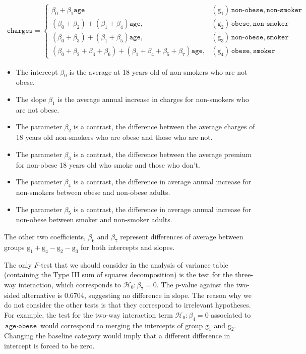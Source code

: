 \documentclass[
  11pt,
  letterpaper,
]{book}
\providecommand{\tightlist}{%
  \setlength{\itemsep}{0pt}\setlength{\parskip}{0pt}}
\theoremstyle{definition}
\theoremstyle{definition}
\theoremstyle{definition}
\theoremstyle{remark}
\begin{document}
\begin{align*}
\texttt{charges}  = 
\begin{cases}
\beta_{0} + \beta_{1}\texttt{age}  & (\mathrm{g}_1)\, \texttt{non-obese}, \texttt{non-smoker} \\
(\beta_{0} + \beta_{2}) + (\beta_{1} + \beta_{4})\texttt{age},  & (\mathrm{g}_2)\,  \texttt{obese}, \texttt{non-smoker} \\
(\beta_{0} + \beta_{3}) + (\beta_{1} + \beta_{5})\texttt{age},  & (\mathrm{g}_3)\,  \texttt{non-obese}, \texttt{smoker} \\
(\beta_{0} + \beta_{2} + \beta_{3}+ \beta_{6}) + (\beta_{1} + \beta_{4} +\beta_{5} + \beta_7)\texttt{age},  & (\mathrm{g}_4)\,  \texttt{obese}, \texttt{smoker}
\end{cases}
\end{align*}

\begin{itemize}
\tightlist
\item
  The intercept \(\beta_0\) is the average at 18 years old of non-smokers who are not obese.
\item
  The slope \(\beta_1\) is the average annual increase in charges for non-smokers who are not obese.
\item
  The parameter \(\beta_2\) is a contrast, the difference between the average charges of 18 years old non-smokers who are obese and those who are not.
\item
  The parameter \(\beta_3\) is a contrast, the difference between the average premium for non-obese 18 years old who smoke and those who don't.
\item
  The parameter \(\beta_4\) is a contrast, the difference in average annual increase for non-smokers between obese and non-obese adults.
\item
  The parameter \(\beta_5\) is a contrast, the difference in average annual increase for non-obese between smoker and non-smoker adults.
\end{itemize}

The other two coefficients, \(\beta_6\) and \(\beta_7\) represent differences of average between groups \(\mathrm{g}_1 + \mathrm{g}_4 - \mathrm{g}_2 - \mathrm{g}_3\) for both intercepts and slopes.

The only \(F\)-test that we should consider in the analysis of variance table (containing the Type III sum of squares decomposition) is the test for the three-way interaction, which corresponds to \(\mathscr{H}_0: \beta_7=0\). The \(p\)-value against the two-sided alternative is \(0.6704\), suggesting no difference in slope. The reason why we do not consider the other tests is that they correspond to irrelevant hypotheses. For example, the test for the two-way interaction term \(\mathscr{H}_0: \beta_4=0\) associated to \(\texttt{age} \cdot \texttt{obese}\) would correspond to merging the intercepts of group \(\mathrm{g}_1\) and \(\mathrm{g}_2\). Changing the baseline category would imply that a different difference in intercept is forced to be zero.
\end{document}
